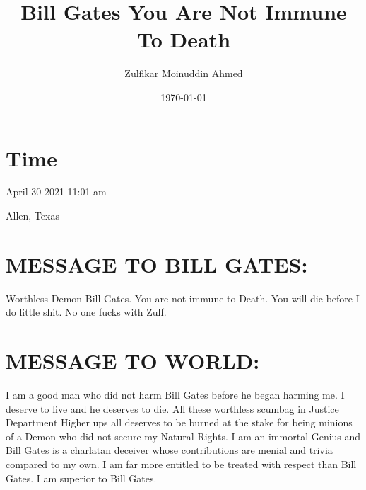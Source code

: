 \documentclass{amsart}
\title{Bill Gates You Are Not Immune To Death}
\author{Zulfikar Moinuddin Ahmed}
\date{\today}
\begin{document}
\maketitle

\section{Time}

April 30 2021 11:01 am

Allen, Texas

\section{MESSAGE TO BILL GATES:}

Worthless Demon Bill Gates.  You are not immune to Death.   You will die before I do little shit.  No one fucks with Zulf.

\section{MESSAGE TO WORLD:}
I am a good man who did not harm Bill Gates before he began harming me.  I deserve to live and he deserves to die.  All these worthless scumbag in Justice Department Higher ups all deserves to be burned at the stake for being minions of a Demon who did not secure my Natural Rights.  I am an immortal Genius and Bill Gates is a charlatan deceiver whose contributions are menial and trivia compared to my own.  I am far more entitled to be treated with respect than Bill Gates.  I am superior to Bill Gates.
\end{document}
